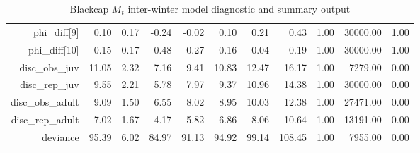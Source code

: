 \begin{table}[ht]
\begin{tabular}{rrrrrrrrrrr}
  phi\_diff[9] & 0.10 & 0.17 & -0.24 & -0.02 & 0.10 & 0.21 & 0.43 & 1.00 & 30000.00 & 1.00 \\ 
  phi\_diff[10] & -0.15 & 0.17 & -0.48 & -0.27 & -0.16 & -0.04 & 0.19 & 1.00 & 30000.00 & 1.00 \\ 
  disc\_obs\_juv & 11.05 & 2.32 & 7.16 & 9.41 & 10.83 & 12.47 & 16.17 & 1.00 & 7279.00 & 0.00 \\ 
  disc\_rep\_juv & 9.55 & 2.21 & 5.78 & 7.97 & 9.37 & 10.96 & 14.38 & 1.00 & 30000.00 & 0.00 \\ 
  disc\_obs\_adult & 9.09 & 1.50 & 6.55 & 8.02 & 8.95 & 10.03 & 12.38 & 1.00 & 27471.00 & 0.00 \\ 
  disc\_rep\_adult & 7.02 & 1.67 & 4.17 & 5.82 & 6.86 & 8.06 & 10.64 & 1.00 & 13191.00 & 0.00 \\ 
  deviance & 95.39 & 6.02 & 84.97 & 91.13 & 94.92 & 99.14 & 108.45 & 1.00 & 7955.00 & 0.00 \\ 
   \hline
\end{tabular}
\caption{Blackcap $M_t$ inter-winter model diagnostic and summary output} 
\label{tab:blackcap_mt_age_inter_summary_output}
\end{table}
